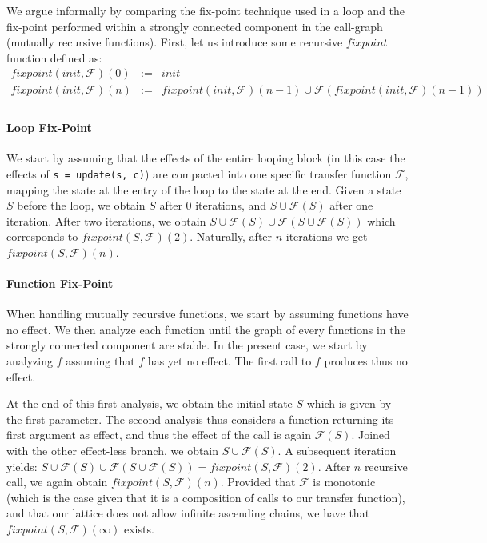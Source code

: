 We argue informally by comparing the fix-point technique used in a loop and the
fix-point performed within a strongly connected component in the call-graph
(mutually recursive functions). First, let us introduce some recursive
$fixpoint$ function defined as:
\begin{eqnarray*}
    fixpoint(init, \mathcal{F})(0) &:=& init \\
    fixpoint(init, \mathcal{F})(n) &:=& fixpoint(init, \mathcal{F})(n-1) \cup \mathcal{F}(fixpoint(init, \mathcal{F})(n-1)) \\
\end{eqnarray*}

\paragraph{Loop Fix-Point}
We start by assuming that the effects of the entire looping block (in this case
the effects of \verb/s = update(s, c)/) are compacted into one specific
transfer function $\mathcal{F}$, mapping the state at the entry of the loop to
the state at the end. Given a state $S$ before the loop, we obtain $S$ after 0
iterations, and $S \cup \mathcal{F}(S)$ after one iteration. After two
iterations, we obtain $S \cup \mathcal{F}(S) \cup \mathcal{F}(S \cup
\mathcal{F}(S))$ which corresponds to $fixpoint(S, \mathcal{F})(2)$. Naturally,
after $n$ iterations we get $fixpoint(S, \mathcal{F})(n)$.

\paragraph{Function Fix-Point}
When handling mutually recursive functions, we start by assuming functions have
no effect. We then analyze each function until the graph of every functions in
the strongly connected component are stable. In the present case, we start by
analyzing $f$ assuming that $f$ has yet no effect. The first call to $f$
produces thus no effect.

At the end of this first analysis, we obtain the initial state $S$ which is
given by the first parameter. The second analysis thus considers a function
returning its first argument as effect, and thus the effect of the call is
again $\mathcal{F}(S)$. Joined with the other effect-less branch, we obtain $S
\cup \mathcal{F}(S)$. A subsequent iteration yields: $S \cup \mathcal{F}(S)
\cup \mathcal{F}(S \cup \mathcal{F}(S)) = fixpoint(S, \mathcal{F})(2)$. After
$n$ recursive call, we again obtain $fixpoint(S, \mathcal{F})(n)$.
Provided that $\mathcal{F}$ is monotonic (which is the case given that it is
a composition of calls to our transfer function), and that our lattice does not
allow infinite ascending chains, we have that $fixpoint(S, \mathcal{F})(\infty)$
exists.

